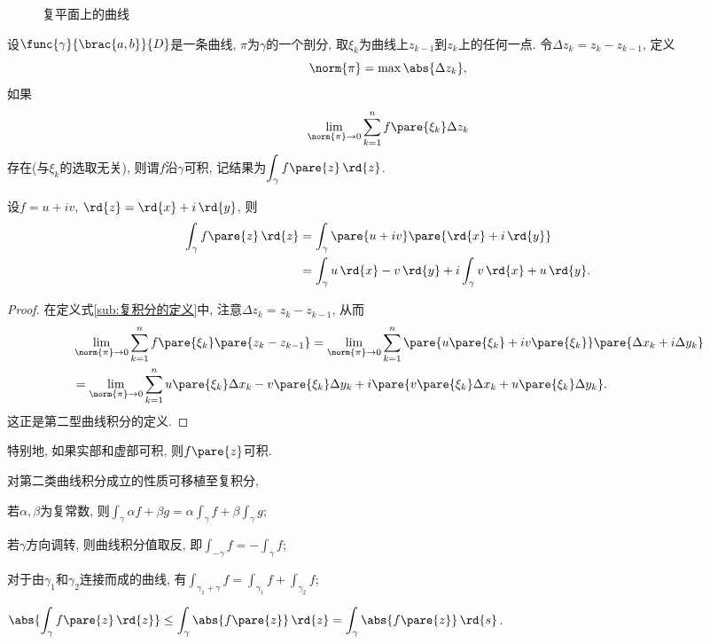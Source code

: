 \documentclass[../ComplexVariable.tex]{subfiles}
\begin{document}
\begin{figure}[ht]
    \centering
    \caption{复平面上的曲线}
    \label{fig:复平面上的曲线}
\end{figure}
设$\func{\gamma}{\brac{a,b}}{D}$是一条曲线, $\pi$为$\gamma$的一个剖分, 取$\xi_k$为曲线上$z_{k-1}$到$z_k$上的任何一点. 令$\Delta z_k = z_k - z_{k-1}$, 定义
\[ \norm{\pi} = \max \abs{\Delta z_k}, \]
如果
\begin{equation}
    \label{eq:复积分的定义}
    \lim_{\norm{\pi}\rightarrow 0} \sum_{k=1}^n f\pare{\xi_k}\Delta z_k 
\end{equation}
存在(与$\xi_k$的选取无关), 则谓$f$沿$\gamma$可积, 记结果为$\displaystyle \int_\gamma f\pare{z}\,\rd{z}$.
\begin{proposition}
    设$f=u+iv$, $\rd{z} = \rd{x} + i\,\rd{y}$, 则
    \begin{align*}
        \int_\gamma f\pare{z}\,\rd{z} &= \int_\gamma \pare{u + iv}\pare{\rd{x} + i\,\rd{y}} \\
        &= \int_\gamma u\,\rd{x} - v\,\rd{y} + i\int_\gamma v\,\rd{x} + u\,\rd{y}.
    \end{align*}
\end{proposition}
\begin{proof}
    在定义式\eqref{sub:复积分的定义}中, 注意$\Delta z_k = z_k - z_{k-1}$, 从而
    \begin{align*}
        &\lim_{\norm{\pi}\rightarrow 0} \sum_{k=1}^n f\pare{\xi_k}\pare{z_k - z_{k-1}} = \lim_{\norm{\pi}\rightarrow 0}\sum_{k=1}^n \pare{u\pare{\xi_k} + iv\pare{\xi_k}}\pare{\Delta x_k + i\Delta y_k} \\
        &= \lim_{\norm{\pi}\rightarrow 0}\sum_{k=1}^n u\pare{\xi_k}\Delta x_k - v\pare{\xi_k}\Delta y_k + i\pare{v\pare{\xi_k}\Delta x_k + u\pare{\xi_k}\Delta y_k}.
    \end{align*}
    这正是第二型曲线积分的定义.
\end{proof}
特别地, 如果实部和虚部可积, 则$f\pare{z}$可积.
\begin{proposition}
    对第二类曲线积分成立的性质可移植至复积分,
    \begin{cenum}
        \item 若$\alpha,\beta$为复常数, 则$\displaystyle \int_\gamma \alpha f + \beta g = \alpha\int_\gamma f + \beta \int_\gamma g$;
        \item 若$\gamma$方向调转, 则曲线积分值取反, 即$\displaystyle \int_{-\gamma} f = - \int_\gamma f$;
        \item 对于由$\gamma_1$和$\gamma_2$连接而成的曲线, 有$\displaystyle \int_{\gamma_1 + \gamma} f = \int_{\gamma_1} f + \int_{\gamma_2} f$;
        \item $\displaystyle \abs{\int_\gamma f\pare{z}\,\rd{z}}\le \int_\gamma \abs{f\pare{z}}\,\rd{z} = \int_\gamma\abs{f\pare{z}}\,\rd{s}$.
    \end{cenum}
\end{proposition}
\end{document}

